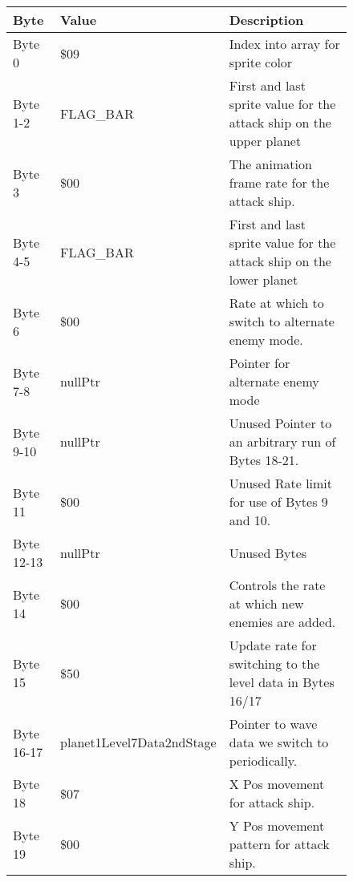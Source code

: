 \begin{figure}[H]
  {
  \setlength{\tabcolsep}{3.0pt}
  \setlength\cmidrulewidth{\heavyrulewidth} %
  \begin{adjustbox}{width=12cm}

\begin{tabular}{lll}
\toprule
 Byte       & Value                     & Description                                                         \\
\midrule
 Byte 0     & \$09                       & Index into array for sprite color                                   \\
 Byte 1-2   & FLAG\_BAR                  & First and last sprite value for the attack ship on the upper planet \\
 Byte 3     & \$00                       & The animation frame rate for the attack ship.                       \\
 Byte 4-5   & FLAG\_BAR                  & First and last sprite value for the attack ship on the lower planet \\
 Byte 6     & \$00                       & Rate at which to switch to alternate enemy mode.                    \\
 Byte 7-8   & nullPtr                   & Pointer for alternate enemy mode                                    \\
 Byte 9-10  & nullPtr                   & Unused Pointer to an arbitrary run of Bytes 18-21.                  \\
 Byte 11    & \$00                       & Unused Rate limit for use of Bytes 9 and 10.                        \\
 Byte 12-13 & nullPtr                   & Unused Bytes                                                        \\
 Byte 14    & \$00                       & Controls the rate at which new enemies are added.                   \\
 Byte 15    & \$50                       & Update rate for switching to the level data in Bytes 16/17          \\
 Byte 16-17 & planet1Level7Data2ndStage & Pointer to wave data we switch to periodically.                     \\
 Byte 18    & \$07                       & X Pos movement for attack ship.                                     \\
 Byte 19    & \$00                       & Y Pos movement pattern for attack ship.                             \\

\end{tabular}
\end{adjustbox}}
\end{figure}
